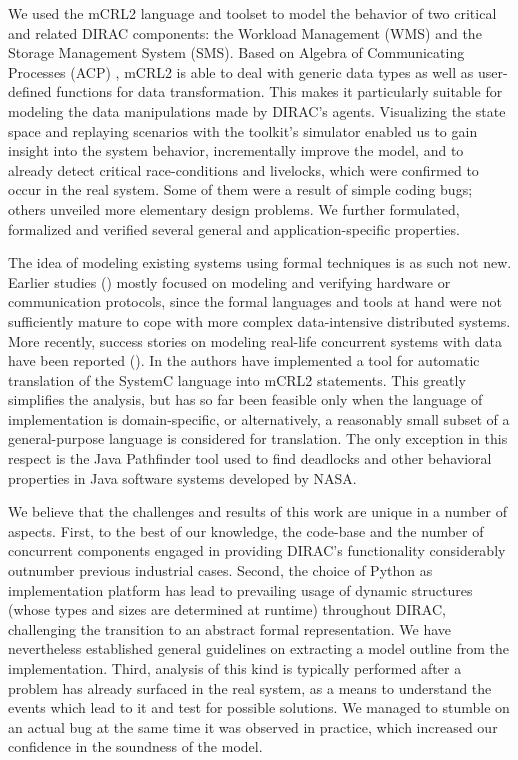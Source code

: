 \documentclass[10pt,conference]{IEEEtran}
\begin{document}
We used the mCRL2 language \cite{FormalLanguagemCRL2} and toolset \cite{mCRL2Toolset} to model the behavior of two
critical and related DIRAC components: the Workload Management (WMS) and the
Storage Management System (SMS). Based on Algebra of Communicating Processes
(ACP) \cite{process_algebra}, mCRL2 is able to deal with generic data types as well as user-defined
functions for data transformation. This makes it particularly suitable for
modeling the data manipulations made by DIRAC's agents. Visualizing the state
space and replaying scenarios with the toolkit's simulator enabled us to gain
insight into the system behavior, incrementally improve the model, and to
already detect critical race-conditions and livelocks, which were confirmed to
occur in the real system. Some of them were a result of simple coding bugs;
others unveiled more elementary design problems. We further formulated,
formalized and verified several general and application-specific properties.

The idea of modeling existing systems using 
formal techniques is as such not new. Earlier studies
(\cite{SPIN_case_study,sessionMgmtMasterThesis,desing_validation_protocols,protocol_verification_muCRL,SLAMToolkit,SlidingWindowProtocol,DHCP_SPIN}) mostly focused
on modeling and verifying hardware or communication protocols, since
the formal languages and tools at hand were not sufficiently mature
to cope with more complex data-intensive distributed systems. More
recently, success stories on modeling real-life concurrent systems with
data have been reported (\cite{CMS_LHC, Linux_driver, SystemC_processAlgebra, Java_PathFinder, ACS_mCRL2}).
In \cite{SystemC_processAlgebra} the authors have implemented a tool for automatic
translation of the SystemC language into mCRL2 statements. This greatly
simplifies the analysis, but has so far been feasible only when the
language of implementation is domain-specific, or alternatively, a
reasonably small subset of a general-purpose language is considered for
translation. The only exception in this respect is the Java Pathfinder
tool \cite{Java_PathFinder} used to find deadlocks and other behavioral properties
in Java software systems developed by NASA.

We believe that the challenges and results of this work are unique in
a number of aspects. First, to the best of our knowledge, the code-base
and the number of concurrent components engaged in providing DIRAC’s
functionality considerably outnumber previous industrial cases. Second,
the choice of Python as implementation platform has lead to prevailing
usage of dynamic structures (whose types and sizes are determined at
runtime) throughout DIRAC, challenging the transition to an abstract
formal representation. We have nevertheless established general
guidelines on extracting a model outline from the implementation. Third,
analysis of this kind is typically performed after a problem has already
surfaced in the real system, as a means to understand the events which
lead to it and test for possible solutions. We managed to stumble on an
actual bug at the same time it was observed in practice, which increased
our confidence in the soundness of the model.
\end{document}
